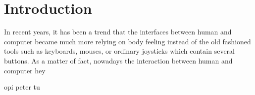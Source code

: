 \chapter{Introduction}
\label{c:intro}


In recent years, it has been a trend that the interfaces between human and computer became much more relying on body feeling instead of the old fashioned tools such as keyboards, mouses, or ordinary joysticks which contain several buttons. As a matter of fact, nowadays the interaction between human and computer hey


opi
peter tu

